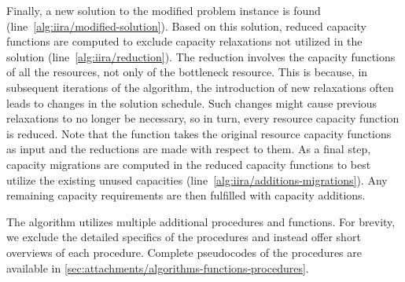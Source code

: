 \begin{steps}
    \item
    Finally, a new solution to the modified problem instance is found (line~\ref{alg:iira/modified-solution}).
    Based on this solution,
    reduced capacity functions are computed to exclude capacity relaxations
    not utilized in the solution (line~\ref{alg:iira/reduction}).
    The reduction involves the capacity functions of all the resources, not only of the bottleneck resource.
    This is because, in subsequent iterations of the algorithm,
    the introduction of new relaxations often leads to changes in the solution schedule.
    Such changes might cause previous relaxations to no longer be necessary,
    so in turn, every resource capacity function is reduced.
    Note that the function 
    takes the original resource capacity functions as input
    and the reductions are made with respect to them.
    As a final step, capacity migrations are computed in the reduced capacity functions
    to best utilize the existing unused capacities (line~\ref{alg:iira/additions-migrations}).
    Any remaining capacity requirements are then fulfilled with capacity additions.
\end{steps}

The algorithm utilizes multiple additional procedures and functions.
For brevity, we exclude the detailed specifics of the procedures
and instead offer short overviews of each procedure.
Complete pseudocodes of the procedures are available in \cref{sec:attachments/algorithms-functions-procedures}.

